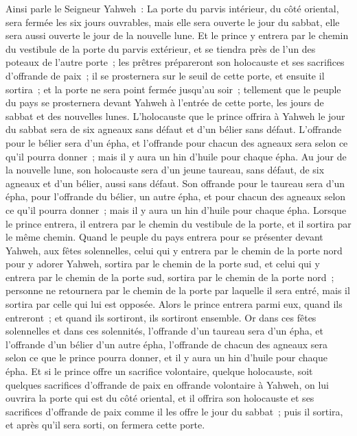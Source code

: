\begin{multicols}{2}
\VerseOne{}Ainsi parle le Seigneur Yahweh~: La porte du parvis intérieur, du côté oriental, sera fermée les six jours ouvrables, mais elle sera ouverte le jour du sabbat, elle sera aussi ouverte le jour de la nouvelle lune.
Et le prince y entrera par le chemin du vestibule de la porte du parvis extérieur, et se tiendra près de l'un des poteaux de l'autre porte~; les prêtres prépareront son holocauste et ses sacrifices d'offrande de paix~; il se prosternera sur le seuil de cette porte, et ensuite il sortira~; et la porte ne sera point fermée jusqu'au soir~;
tellement que le peuple du pays se prosternera devant Yahweh à l'entrée de cette porte, les jours de sabbat et des nouvelles lunes.
L'holocauste que le prince offrira à Yahweh le jour du sabbat sera de six agneaux sans défaut et d'un bélier sans défaut.
L'offrande pour le bélier sera d'un épha, et l'offrande pour chacun des agneaux sera selon ce qu'il pourra donner~; mais il y aura un hin d'huile pour chaque épha.
Au jour de la nouvelle lune, son holocauste sera d'un jeune taureau, sans défaut, de six agneaux et d'un bélier, aussi sans défaut.
Son offrande pour le taureau sera d'un épha, pour l'offrande du bélier, un autre épha, et pour chacun des agneaux selon ce qu'il pourra donner~; mais il y aura un hin d'huile pour chaque épha.
Lorsque le prince entrera, il entrera par le chemin du vestibule de la porte, et il sortira par le même chemin.
Quand le peuple du pays entrera pour se présenter devant Yahweh, aux fêtes solennelles, celui qui y entrera par le chemin de la porte nord pour y adorer Yahweh, sortira par le chemin de la porte sud, et celui qui y entrera par le chemin de la porte sud, sortira par le chemin de la porte nord~; personne ne retournera par le chemin de la porte par laquelle il sera entré, mais il sortira par celle qui lui est opposée.
Alors le prince entrera parmi eux, quand ils entreront~; et quand ils sortiront, ils sortiront ensemble.
Or dans ces fêtes solennelles et dans ces solennités, l'offrande d'un taureau sera d'un épha, et l'offrande d'un bélier d'un autre épha, l'offrande de chacun des agneaux sera selon ce que le prince pourra donner, et il y aura un hin d'huile pour chaque épha.
Et si le prince offre un sacrifice volontaire, quelque holocauste, soit quelques sacrifices d'offrande de paix en offrande volontaire à Yahweh, on lui ouvrira la porte qui est du côté oriental, et il offrira son holocauste et ses sacrifices d'offrande de paix comme il les offre le jour du sabbat~; puis il sortira, et après qu'il sera sorti, on fermera cette porte.

\end{multicols}
